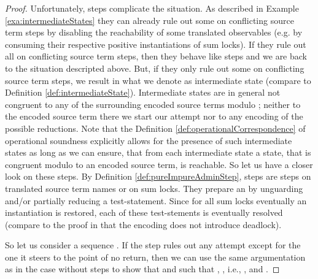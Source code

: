 \documentclass[]{llncs}
\begin{document}
\begin{proof}
	Unfortunately, \impure \admin steps complicate the situation. As described in Example \ref{exa:intermediateStates} they can already rule out some \simulations on conflicting source term steps by disabling the reachability of some translated observables (e.g. by consuming their respective positive instantiations of sum locks). If they rule out all \simulations on conflicting source term steps, then they behave like \nonAdmin steps and we are back to the situation descripted above. But, if they only rule out some \simulations on conflicting source term steps, we result in what we denote as intermediate state (compare to Definition \ref{def:intermediateState}). Intermediate states are in general not congruent to any of the surrounding encoded source terms modulo ; neither to the encoded source term there we start our \simulation attempt nor to any encoding of the possible reductions. Note that the Definition \ref{def:operationalCorrespondence} of operational soundness explicitly allows for the presence of such intermediate states as long as we can ensure, that from each intermediate state a state, that is congruent modulo  to an encoded source term, is reachable. So let us have a closer look on these \impure \admin steps. By Definition \ref{def:pureImpureAdminStep}, \impure \admin steps are steps on translated source term names or on sum locks. They prepare an \simulation by unguarding and/or partially reducing a test-statement. Since for all sum locks eventually an instantiation is restored, each of these test-stements is eventually resolved (compare to the proof in \cite{nestmann00} that the encoding  does not introduce deadlock).
	
	So let us consider a sequence . If the \nonAdmin step  rules out any \simulation attempt except for the one it steers to the point of no return, then we can use the same argumentation as in the case without \impure \admin steps to show that  and  such that , , i.e., , and .
	

\end{proof}
\end{document}
